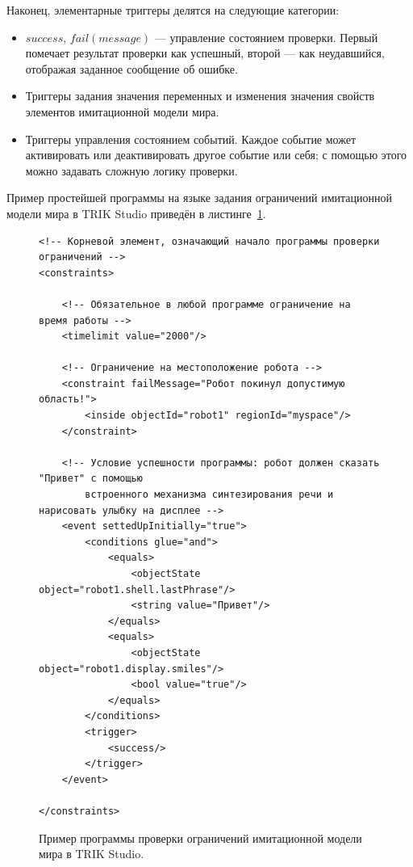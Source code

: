 \documentclass[a5paper]{article}
\begin{document}
Наконец, элементарные триггеры делятся на следующие категории:
\begin{itemize}
    \item $success$, $fail(message)$ --- управление состоянием проверки. Первый помечает результат проверки как успешный, второй --- как неудавшийся, отображая заданное сообщение об ошибке.
    \item Триггеры задания значения переменных и изменения значения свойств элементов имитационной модели мира.
    \item Триггеры управления состоянием событий. Каждое событие может активировать или деактивировать другое событие или себя; с помощью этого можно задавать сложную логику проверки.
\end{itemize}

Пример простейшей программы на языке задания ограничений имитационной модели мира в TRIK Studio приведён в листинге~\ref{code:constraints}.

\captionsetup[figure]{name=Листинг}
\setcounter{figure}{0}

\begin{figure}[!t]
\begin{verbatim}
<!-- Корневой элемент, означающий начало программы проверки ограничений -->
<constraints>

    <!-- Обязательное в любой программе ограничение на время работы -->
    <timelimit value="2000"/>

    <!-- Ограничение на местоположение робота -->
    <constraint failMessage="Робот покинул допустимую область!">
        <inside objectId="robot1" regionId="myspace"/>
    </constraint>

    <!-- Условие успешности программы: робот должен сказать "Привет" с помощью
        встроенного механизма синтезирования речи и нарисовать улыбку на дисплее -->
    <event settedUpInitially="true">
        <conditions glue="and">
            <equals>
                <objectState object="robot1.shell.lastPhrase"/>
                <string value="Привет"/>
            </equals>
            <equals>
                <objectState object="robot1.display.smiles"/>
                <bool value="true"/>
            </equals>
        </conditions>
        <trigger>
            <success/>
        </trigger>
    </event>

</constraints>
\end{verbatim}
\caption{Пример программы проверки ограничений имитационной модели мира в TRIK Studio.}
\label{code:constraints}
\end{figure}
\end{document}
